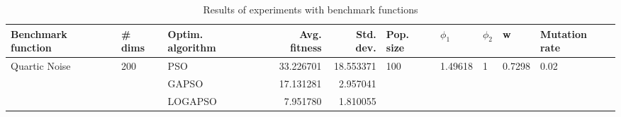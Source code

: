 \begin{table}
\centering
\caption{Results of experiments with benchmark functions}
\begin{tabular}{lllrrlllll}
\toprule
            Benchmark function &              \# dims & Optim. algorithm &  Avg. fitness &  Std. dev. &            Pop. size &               $\phi_{1}$ &         $\phi_{2}$ &                       w &         Mutation rate \\
\midrule
\multirow{3}{*}{Quartic Noise} & \multirow{3}{*}{200} &              PSO &     33.226701 &  18.553371 & \multirow{3}{*}{100} & \multirow{3}{*}{1.49618} & \multirow{3}{*}{1} & \multirow{3}{*}{0.7298} & \multirow{3}{*}{0.02} \\
                               &                      &            GAPSO &     17.131281 &   2.957041 &                      &                          &                    &                         &                       \\
                               &                      &          LOGAPSO &      7.951780 &   1.810055 &                      &                          &                    &                         &                       \\
\bottomrule
\end{tabular}
\end{table}
